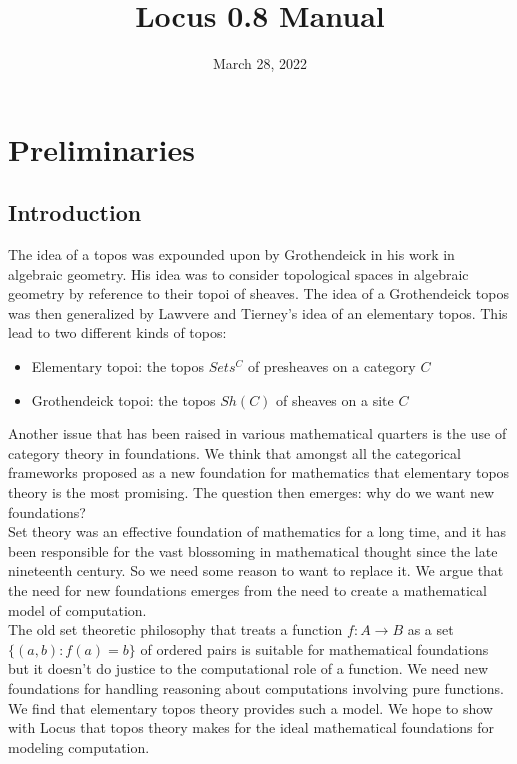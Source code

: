 \documentclass[a4paper,11pt]{report}
\title{Locus 0.8 Manual}
\date{March 28, 2022}
\author{}
\begin{document}
\maketitle 

\newpage

\tableofcontents

\newpage 

\chapter{Preliminaries}

\section{Introduction}
The idea of a topos was expounded upon by Grothendeick in his work in algebraic geometry. His idea was to consider topological spaces in algebraic geometry by reference to their topoi of sheaves. The idea of a Grothendeick topos was then generalized by Lawvere and Tierney's idea of an elementary topos. This lead to two different kinds of topos:

\begin{itemize}
 \item Elementary topoi: the topos $Sets^C$ of presheaves on a category $C$
 \item Grothendeick topoi: the topos $Sh(C)$ of sheaves on a site $C$
\end{itemize}

Another issue that has been raised in various mathematical quarters is the use of category theory in foundations. We think that amongst all the categorical frameworks proposed as a new foundation for mathematics that elementary topos theory is the most promising. The question then emerges: why do we want new foundations? \\

Set theory was an effective foundation of mathematics for a long time, and it has been responsible for the vast blossoming in mathematical thought since the late nineteenth century. So we need some reason to want to replace it. We argue that the need for new foundations emerges from the need to create a mathematical model of computation. \\ 

The old set theoretic philosophy that treats a function $f : A \to B$ as a set $\{(a,b) : f(a) = b \}$ of ordered pairs is suitable for mathematical foundations but it doesn't do justice to the computational role of a function. We need new foundations for handling reasoning about computations involving pure functions. We find that elementary topos theory provides such a model. We hope to show with Locus that topos theory makes for the ideal mathematical foundations for modeling computation.
\end{document}
